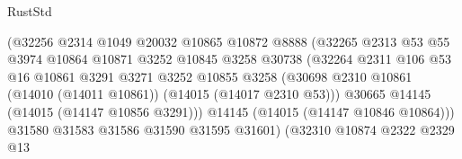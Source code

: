 \begin{lexlean}{RustStd}
\begin{coremodule}
                                        (@32256
                                          @2314
                                          @1049
                                          @20032
                                          @10865
                                          @10872
                                          @8888
                                          (@32265
                                            @2313
                                            @53
                                            @55
                                            @3974
                                            @10864
                                            @10871
                                            @3252
                                            @10845
                                            @3258
                                            @30738
                                            (@32264
                                              @2311
                                              @106
                                              @53
                                              @16
                                              @10861
                                              @3291
                                              @3271
                                              @3252
                                              @10855
                                              @3258
                                              (@30698
                                                @2310
                                                @10861
                                                (@14010 (@14011 @10861))
                                                (@14015 (@14017 @2310 @53)))
                                              @30665
                                              @14145
                                              (@14015 (@14147 @10856 @3291)))
                                            @14145
                                            (@14015 (@14147 @10846 @10864)))
                                          @31580
                                          @31583
                                          @31586
                                          @31590
                                          @31595
                                          @31601)
                                        (@32310
                                          @10874
                                          @2322
                                          @2329
                                          @13

\end{coremodule}
\end{lexlean}
